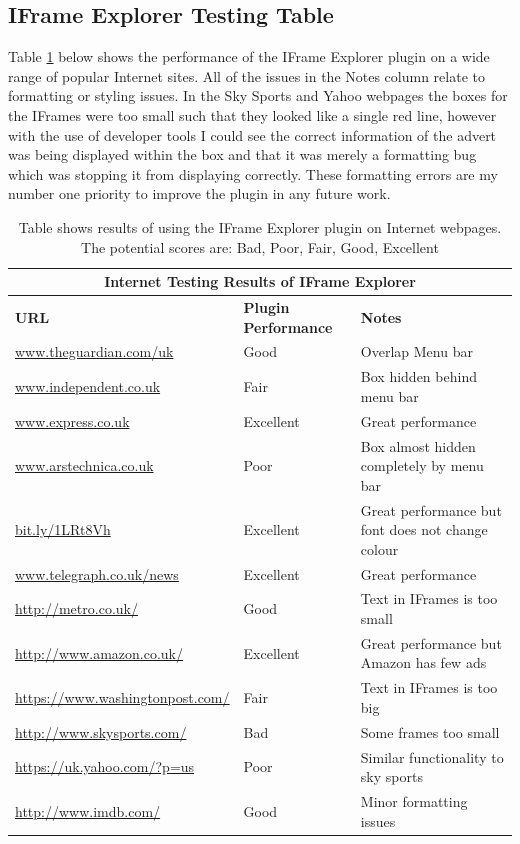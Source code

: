 \documentclass[12pt]{article}
\begin{document}
\subsection{IFrame Explorer Testing Table}  \label{iETesting}
Table \ref{table:4} below shows the performance of the IFrame Explorer plugin on a wide range of popular Internet sites. All of the issues in the Notes column relate to formatting or styling issues. In the Sky Sports and Yahoo webpages the boxes for the IFrames were too small such that they looked like a single red line, however with the use of developer tools I could see the correct information of the advert was being displayed within the box and that it was merely a formatting bug which was stopping it from displaying correctly. These formatting errors are my number one priority to improve the plugin in any future work. 

{
\begin{table} [H]
\centering
\begin{tabular}{ |p{5cm}|p{5cm}|p{5cm}|  }
\hline
\multicolumn{3}{|c|}{\textbf{Internet Testing Results of IFrame Explorer}} \\
\hline
\textbf{URL} & \textbf{Plugin Performance} & \textbf{Notes} \\
\hline
\url{www.theguardian.com/uk} & Good & Overlap Menu bar \\
\hline
\url{www.independent.co.uk} & Fair & Box hidden behind menu bar \\
\hline
\url{www.express.co.uk} & Excellent & Great performance \\
\hline
\url{www.arstechnica.co.uk} & Poor & Box almost hidden completely by menu bar  \\
\hline
\url{bit.ly/1LRt8Vh} & Excellent & Great performance but font does not change colour \\
\hline
\url{www.telegraph.co.uk/news} & Excellent & Great performance   \\
\hline
\url{http://metro.co.uk/} & Good & Text in IFrames is too small \\
\hline
\url{http://www.amazon.co.uk/} & Excellent & Great performance but Amazon has few ads  \\
\hline
\url{https://www.washingtonpost.com/} & Fair & Text in IFrames is too big \\
\hline
\url{http://www.skysports.com/} & Bad & Some frames too small \\
\hline
\url{https://uk.yahoo.com/?p=us} & Poor & Similar functionality to sky sports \\
\hline
\url{http://www.imdb.com/} & Good & Minor formatting issues \\
\hline
\end{tabular}
\caption{Table shows results of using the IFrame Explorer plugin on Internet webpages. The potential scores are: Bad, Poor, Fair, Good, Excellent}
\label{table:4}
\end{table}
}
\end{document}
